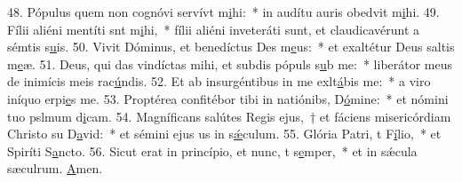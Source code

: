 48. Pópulus quem non cognóvi servívt m\uline{i}hi:~* in audítu auris obedvit m\uline{i}hi.
49. Fílii aliéni mentíti snt m\uline{i}hi,~* fílii aliéni inveteráti sunt, et claudicavérunt a sémtis s\uline{u}is.
50. Vivit Dóminus, et benedíctus Des m\uline{e}us:~* et exaltétur Deus saltis m\uline{e}æ.
51. Deus, qui das vindíctas mihi, et subdis pópuls s\uline{u}b me:~* liberátor meus de inimícis meis rac\uline{ú}ndis.
52. Et ab insurgéntibus in me exlt\uline{á}bis me:~* a viro iníquo erpi\uline{e}s me.
53. Proptérea confitébor tibi in natiónibs, D\uline{ó}mine:~* et nómini tuo pslmum d\uline{i}cam.
54. Magníficans salútes Regis ejus,~† et fáciens misericórdiam Christo su D\uline{a}vid:~* et sémini ejus us in s\uline{ǽ}culum.
55. Glória Patri, t F\uline{í}lio,~* et Spiríti S\uline{a}ncto.
56. Sicut erat in princípio, et nunc, t s\uline{e}mper,~* et in sǽcula sæculrum. \uline{A}men.
